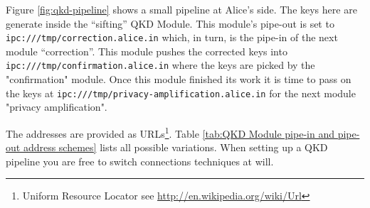 Figure \ref{fig:qkd-pipeline} shows a small pipeline at Alice's side. The keys here are generate inside the ``sifting'' QKD Module. This module's pipe-out is set to \texttt{ipc:///tmp/correction.alice.in} which, in turn, is the pipe-in of the next module ``correction''. This module pushes the corrected keys into \texttt{ipc:///tmp/confirmation.alice.in} where the keys are picked by the "confirmation" module. Once this module finished its work it is time to pass on the keys at \texttt{ipc:///tmp/privacy-amplification.alice.in} for the next module "privacy amplification".

\medskip

The addresses are provided as URLs\footnote{Uniform Resource Locator see \url{http://en.wikipedia.org/wiki/Url}}. Table \ref{tab:QKD Module pipe-in and pipe-out address schemes} lists all possible variations. When setting up a QKD pipeline you are free to switch connections techniques at will.

